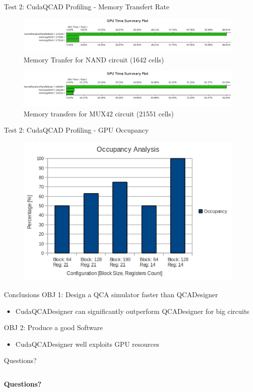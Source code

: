 \documentclass[10pt, red]{beamer}
\begin{document}
	\begin{frame}{Test 2: CudaQCAD Profiling - Memory Transfert Rate}
	 	\begin{figure}
			\centering
			\includegraphics[width=\textwidth]{img/GPUTimeSummaryPlotNAND}
			\caption{Memory Tranfer for NAND circuit (1642 cells)}
	 	\end{figure} 
		\begin{figure}
			\centering
			\includegraphics[width=\textwidth]{img/GPUTimeSummaryPlotMUX42}
			\caption{Memory transfers for MUX42 circuit (21551 cells)}
		\end{figure}
	\end{frame}

	\begin{frame}{Test 2: CudaQCAD Profiling - GPU Occupancy}
	 	\begin{figure}
			\centering
			\includegraphics[width=\textwidth]{img/OccupancyAnalysis}
	 	\end{figure} 
	\end{frame}

	\begin{frame}{Conclusions}
		OBJ 1: Design a QCA simulator faster than QCADesigner
		\begin{itemize}
			\item CudaQCADesigner can significantly outperform QCADesigner for big circuits
		\end{itemize}
		OBJ 2: Produce a good Software
		\begin{itemize}
			\item CudaQCADesigner well exploits GPU resources
		\end{itemize}
	\end{frame}

	\begin{frame}{Questions?}
		\begin{columns}
			\textbf{Questions?}
		\end{columns}
	\end{frame}
\end{document}
